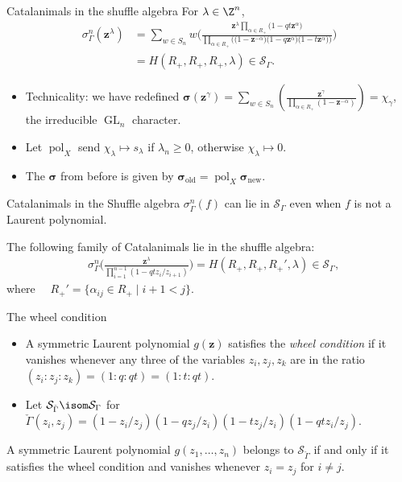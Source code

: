 \documentclass[dvipsnames]{beamer}
\newcommand{\zz}{{\boldsymbol z}}
\newcommand{\sigmabold}{\boldsymbol \sigma}
\DeclareMathOperator{\pol}{pol}
\DeclareMathOperator{\GL}{GL}
\newcommand{\Scal}{\mathcal{S}}
\newcommand{\tGamma}{{\check{\Gamma}}} %
\theoremstyle{definition}
\begin{document}
\begin{frame}{Catalanimals in the shuffle algebra}
  For  $\lambda \in \Z^n$,
\vspace{-3mm}
\begin{align*}
\sigma_\Gamma^n(\zz^\lambda) &=
\sum_{w \in S_n} w\bigg(\frac{\zz ^\lambda \prod_{\alpha \in R_+}
\big(1-q t \zz ^\alpha \big)}
{\prod_{\alpha \in R_+}\big(\big(1-\zz ^{-\alpha}\big) \big(1-q  \zz ^\alpha\big)
 \big(1-t \zz ^\alpha\big)\big)}
\bigg)
 \\
&= H(R_+,R_+,R_+,\lambda)  \in \Scal_\Gamma.
\end{align*}
\begin{itemize}
\item Technicality: we have redefined
  \(\sigmabold(\zz^\gamma) = \sum_{w \in S_n}\left(
    \frac{\zz^\gamma}{\prod_{\alpha\in R_+}(1-\zz^{-\alpha})} \right)
  = \chi_\gamma\), the irreducible \(\GL_n\) character.
  \item Let \(\pol_X\) send \(\chi_\lambda \mapsto s_\lambda\) if
    \(\lambda_n \geq 0\), otherwise \(\chi_\lambda \mapsto 0\).
  \item The \(\sigmabold\) from before is given by
  \(\sigmabold_{\text{old}} = \pol_X \sigmabold_{\text{new}}\).
\end{itemize}
\end{frame}
\begin{frame}{Catalanimals in the Shuffle algebra}
 $\sigma_\Gamma^n(f)$ can lie in  $\Scal_\Gamma$ even when  $f$ is not a Laurent polynomial.
\begin{theorem}[Negut]
The following family of Catalanimals lie in the shuffle algebra:
\vspace{-3mm}
\begin{align*}
& \sigma_\Gamma^n\Big(\frac{\zz^\lambda}{\prod_{i=1}^{n-1} (1-qt z_i/z_{i+1}) }\Big)
= H(R_+,R_+,R_+',\lambda) \in \Scal_\Gamma,
\end{align*}
where  \ \, $R_+' = \{ \alpha_{ij} \in R_+ \mid i+1 < j \}.$
\end{theorem}
\end{frame}
\begin{frame}{The wheel condition}
  \begin{itemize}
  \item A symmetric Laurent polynomial \(g(\zz)\) satisfies the
    \emph{wheel condition} if it vanishes whenever any three of the
    variables \(z_i,z_j,z_k\) are in the ratio
    \((z_i:z_j:z_k) = (1:q:qt) =
    (1:t:qt)\).
    \item Let \(\Scal_{\tGamma} \isom \Scal_\Gamma\) for
    \(\tGamma(z_i,z_j) = (1-z_i/z_j)(1-q z_j/z_i)(1-t z_j/z_i)(1 - qt
    z_i/z_j)\).
  \end{itemize}
\begin{theorem}[Negut]
A symmetric Laurent polynomial $g(z_{1},\ldots,z_{n})$ belongs to
$\Scal _{\tGamma }$ if and only if it satisfies the wheel
condition and vanishes whenever $z_{i} = z_{j}$ for $i\not =j$.
\end{theorem}
\end{frame}
\end{document}

